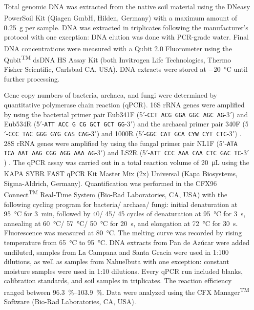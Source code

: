 Total genomic DNA was extracted from the native soil material using the DNeasy\textsuperscript{\textregistered} PowerSoil\textsuperscript{\textregistered} Kit (Qiagen GmbH, Hilden, Germany) with a maximum amount of \SI{0.25}{\gram} per sample. DNA was extracted in triplicates following the manufacturer’s protocol with one exception: DNA elution was done with PCR-grade water. Final DNA concentrations were measured with a Qubit\textsuperscript{\textregistered} 2.0 Fluorometer using the Qubit\textsuperscript{TM} dsDNA HS Assay Kit (both Invitrogen Life Technologies, Thermo Fisher Scientific, Carlsbad CA, USA). DNA extracts were stored at \SI{-20}{\degreeCelsius} until further processing.

Gene copy numbers of bacteria, archaea, and fungi were determined by quantitative polymerase chain reaction (qPCR). 16S rRNA genes were amplified by using the bacterial primer pair Eub341F (5\('\)-\texttt{CCT ACG GGA GGC AGC AG}-3\('\)) and Eub534R (5\('\)-\texttt{ATT ACC G CG GCT GCT GG}-3\('\)) \citep{Muyzer1993} and the archaeal primer pair 340F (5\('\)-\texttt{CCC TAC GGG GYG CAS CAG}-3\('\)) and 1000R (5\('\)-\texttt{GGC CAT GCA CYW CYT CTC}-3\('\)) \citep{Gantner2011}. 28S rRNA genes were amplified by using the fungal primer pair NL1F (5\('\)-\texttt{ATA TCA AAT AAG CGG AGG AAA AG}-3\('\)) and LS2R (5\('\)-\texttt{ATT CCC AAA CAA CTC GAC TC}-3\('\)) \citep{Bates2009}. The qPCR assay was carried out in a total reaction volume of \SI{20}{\micro\liter} using the KAPA SYBR\textsuperscript{\textregistered} FAST qPCR Kit Master Mix (2x) Universal (Kapa Biosystems, Sigma-Aldrich, Germany). Quantification was performed in the CFX96 Connect\textsuperscript{TM} Real-Time System (Bio-Rad Laboratories, CA, USA) with the following cycling program for bacteria/ archaea/ fungi: initial denaturation at \SI{95}{\degreeCelsius} for \SI{3}{\minute}, followed by 40/ 45/ 45 cycles of denaturation at \SI{95}{\degreeCelsius} for \SI{3}{\second}, annealing at \SI{60}{\degreeCelsius}/ \SI{57}{\degreeCelsius}/ \SI{50}{\degreeCelsius} for \SI{20}{\second}, and elongation at \SI{72}{\degreeCelsius} for \SI{30}{\second}. Fluorescence was measured at \SI{80}{\degreeCelsius}. The melting curve was recorded by rising temperature from \SI{65}{\degreeCelsius} to \SI{95}{\degreeCelsius}. DNA extracts from Pan de Az{\'u}car were added undiluted, samples from La Campana and Santa Gracia were used in 1:100 dilutions, as well as samples from Nahuelbuta with one exception: constant moisture samples were used in 1:10 dilutions. Every qPCR run included blanks, calibration standards, and soil samples in triplicates. The reaction efficiency ranged between \SIrange{96.3}{103.9}{\percent}. Data were analyzed using the CFX Manager\textsuperscript{TM} Software (Bio-Rad Laboratories, CA, USA).

